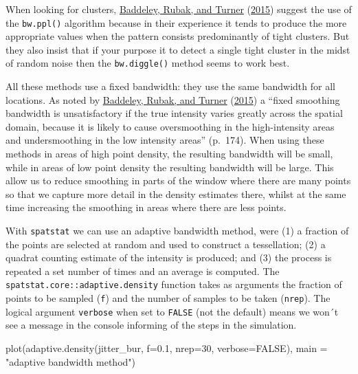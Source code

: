 \documentclass[
  krantz2]{krantz}
\makeatletter
\newenvironment{Shaded}{\begin{snugshade}}{\end{snugshade}}
\newcommand{\AttributeTok}[1]{\textcolor[rgb]{0.61,0.61,0.61}{#1}}
\newcommand{\ConstantTok}[1]{\textcolor[rgb]{0,0,0}{#1}}
\newcommand{\DecValTok}[1]{\textcolor[rgb]{0.06,0.06,0.06}{#1}}
\newcommand{\FloatTok}[1]{\textcolor[rgb]{0.06,0.06,0.06}{#1}}
\newcommand{\FunctionTok}[1]{\textcolor[rgb]{0,0,0}{#1}}
\newcommand{\NormalTok}[1]{#1}
\newcommand{\StringTok}[1]{\textcolor[rgb]{0.5,0.5,0.5}{#1}}
\newenvironment{kframe}{%
\medskip{}
\setlength{\fboxsep}{.8em}
 \def\at@end@of@kframe{}%
 \ifinner\ifhmode%
  \def\at@end@of@kframe{\end{minipage}}%
  \begin{minipage}{\columnwidth}%
 \fi\fi%
 \def\FrameCommand##1{\hskip\@totalleftmargin \hskip-\fboxsep
 \colorbox{shadecolor}{##1}\hskip-\fboxsep
     \hskip-\linewidth \hskip-\@totalleftmargin \hskip\columnwidth}%
 \MakeFramed {\advance\hsize-\width
   \@totalleftmargin\z@ \linewidth\hsize
   \@setminipage}}%
 {\par\unskip\endMakeFramed%
 \at@end@of@kframe}
\renewenvironment{Shaded}{\begin{kframe}}{\end{kframe}}
\makeatother
\begin{document}
When looking for clusters, \protect\hyperlink{ref-Baddeley_2016}{Baddeley, Rubak, and Turner} (\protect\hyperlink{ref-Baddeley_2016}{2015}) suggest the use of the \texttt{bw.ppl()} algorithm because in their experience it tends to produce the more appropriate values when the pattern consists predominantly of tight clusters. But they also insist that if your purpose it to detect a single tight cluster in the midst of random noise then the \texttt{bw.diggle()} method seems to work best.

All these methods use a fixed bandwidth: they use the same bandwidth for all locations. As noted by \protect\hyperlink{ref-Baddeley_2016}{Baddeley, Rubak, and Turner} (\protect\hyperlink{ref-Baddeley_2016}{2015}) a ``fixed smoothing bandwidth is unsatisfactory if the true intensity varies greatly across the spatial domain, because it is likely to cause oversmoothing in the high-intensity areas and undersmoothing in the low intensity areas'' (p.~174). When using these methods in areas of high point density, the resulting bandwidth will be small, while in areas of low point density the resulting bandwidth will be large. This allow us to reduce smoothing in parts of the window where there are many points so that we capture more detail in the density estimates there, whilst at the same time increasing the smoothing in areas where there are less points.

With \texttt{spatstat} we can use an adaptive bandwidth method, were (1) a fraction of the points are selected at random and used to construct a tessellation; (2) a quadrat counting estimate of the intensity is produced; and (3) the process is repeated a set number of times and an average is computed. The \texttt{spatstat.core::adaptive.density} function takes as arguments the fraction of points to be sampled (\texttt{f}) and the number of samples to be taken (\texttt{nrep}). The logical argument \texttt{verbose} when set to \texttt{FALSE} (not the default) means we won´t see a message in the console informing of the steps in the simulation.

\begin{Shaded}
\begin{Highlighting}[]
\FunctionTok{plot}\NormalTok{(}\FunctionTok{adaptive.density}\NormalTok{(jitter\_bur, }\AttributeTok{f=}\FloatTok{0.1}\NormalTok{, }\AttributeTok{nrep=}\DecValTok{30}\NormalTok{, }\AttributeTok{verbose=}\ConstantTok{FALSE}\NormalTok{), }
     \AttributeTok{main =} \StringTok{"adaptive bandwidth method"}\NormalTok{)}
\end{Highlighting}
\end{Shaded}
\end{document}
